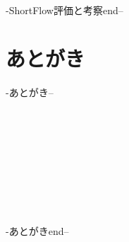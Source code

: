 \documentclass{ieicej}
\begin{document}
\\
\\
\\
\\
\\
\\
\\
\\
\\
\\
\\
\\
\\
\\
\\
\\
\\
\\
\\
\\
\\
\\
\\
\\
\\
\\
\\
\\
\\
\\
\\
\\
\\
-ShortFlow評価と考察end--

\section{あとがき}
-あとがき--\\
\\
\\
\\
\\
\\
\\
\\
\\
\\
-あとがきend--
\end{document}
